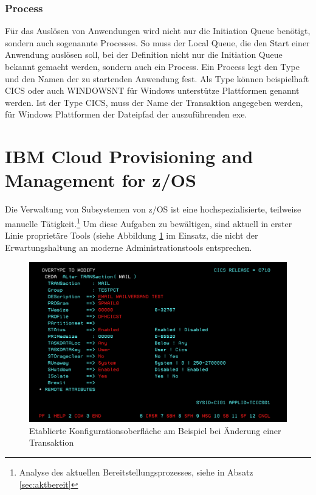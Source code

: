 \subsubsection{Process}
Für das Auslösen von Anwendungen wird nicht nur die Initiation Queue benötigt, sondern auch sogenannte \glqq Processes\grqq.
So muss der Local Queue, die den Start einer Anwendung auslösen soll, bei der Definition nicht nur die Initiation Queue bekannt gemacht werden, sondern auch ein Process.
Ein Process legt den \glqq Type\grqq{} und den Namen der zu startenden Anwendung fest.
Als \glqq Type\grqq{} können beispielhaft CICS oder auch WINDOWSNT für Windows unterstütze Plattformen genannt werden.
Ist der \glqq Type\grqq{} CICS,  muss der Name der Transaktion angegeben werden, für Windows Plattformen der Dateipfad der auszuführenden exe.
\cite{Aranha.2013}

\section{\glqq IBM Cloud Provisioning and Management for z/OS\grqq}\label{sec:tool}
Die Verwaltung von Subsystemen von z/OS ist eine hochspezialisierte, teilweise manuelle Tätigkeit.\footnote{Analyse des aktuellen Bereitstellungsprozesses, siehe in Absatz \ref{sec:aktbereit}}
Um diese Aufgaben zu bewältigen, sind aktuell in erster Linie proprietäre Tools (siehe Abbildung \ref{fig:configalt} im Einsatz, die nicht der Erwartungshaltung an moderne Administrationstools entsprechen.

\begin{figure}[h]
\centering
\includegraphics[width=\textwidth]{figures/Transaktionbearbeitenalt.PNG}
\caption{Etablierte Konfigurationsoberfläche am Beispiel bei Änderung einer Transaktion}
\label{fig:configalt}
\end{figure}

